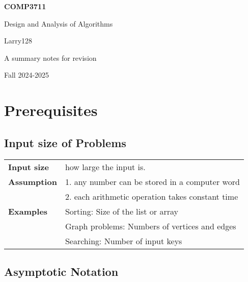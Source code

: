 \documentclass[11pt]{article}
\begin{document}
\begin{titlepage}
    \begin{center}
        \vspace*{1cm}
            
        \Huge
        \textbf{COMP3711}
            
        \vspace{0.5cm}
        \LARGE
        Design and Analysis of Algorithms
            
        \vspace{1.5cm}
            
        Larry128
            
        \vfill
            
        A summary notes for revision
            
        \vspace{0.8cm}
                
        \Large
        Fall 2024-2025
            
    \end{center}
\end{titlepage}

\tableofcontents
\newpage


\section{Prerequisites}
\subsection{Input size of Problems}

\begin{tabular}{ll}
\textbf{Input size}& how large the input is.\\
\textbf{Assumption}& 1. any number can be stored in a computer word\\
&2. each arithmetic operation takes constant time\\
\textbf{Examples}& Sorting: Size of the list or array\\
& Graph problems: Numbers of vertices and edges\\
& Searching: Number of input keys
\end{tabular}

\subsection{Asymptotic Notation}
\end{document}
